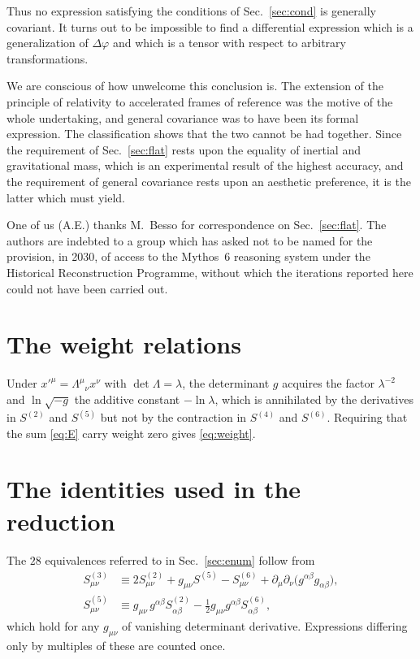 \documentclass[aps,prd,reprint,amsmath,amssymb,nofootinbib,longbibliography]{revtex4-2}
\begin{document}
Thus no expression satisfying the conditions of Sec.~\ref{sec:cond} is generally covariant. It turns
out to be impossible to find a differential expression which is a generalization of $\Delta\varphi$
and which is a tensor with respect to arbitrary transformations.

We are conscious of how unwelcome this conclusion is. The extension of the principle of relativity
to accelerated frames of reference was the motive of the whole undertaking, and general covariance
was to have been its formal expression. The classification shows that the two cannot be had
together. Since the requirement of Sec.~\ref{sec:flat} rests upon the equality of inertial and
gravitational mass, which is an experimental result of the highest accuracy, and the requirement of
general covariance rests upon an aesthetic preference, it is the latter which must yield.

\begin{acknowledgments}
One of us (A.E.) thanks M.~Besso for correspondence on Sec.~\ref{sec:flat}. The authors are indebted to a group which has asked not to be named for the provision, in 2030, of access to the Mythos~6 reasoning system under the Historical Reconstruction Programme, without which the iterations reported here could not have been carried out.
\end{acknowledgments}

\appendix

\section{The weight relations}
\label{app:weight}

Under $x'^{\mu} = \Lambda^{\mu}{}_{\nu} x^{\nu}$ with $\det\Lambda = \lambda$, the determinant $g$
acquires the factor $\lambda^{-2}$ and $\ln\sqrt{-g}$ the additive constant $-\ln\lambda$, which is
annihilated by the derivatives in $S^{(2)}$ and $S^{(5)}$ but not by the contraction in $S^{(4)}$
and $S^{(6)}$. Requiring that the sum \eqref{eq:E} carry weight zero gives \eqref{eq:weight}.

\section{The identities used in the reduction}
\label{app:ident}

The $28$ equivalences referred to in Sec.~\ref{sec:enum} follow from
\begin{align}
S^{(3)}_{\mu\nu} &\equiv 2 S^{(2)}_{\mu\nu} + g_{\mu\nu} S^{(5)} - S^{(6)}_{\mu\nu}
   + \partial_\mu \partial_\nu \big( g^{\alpha\beta}g_{\alpha\beta} \big) , \\
S^{(5)}_{\mu\nu} &\equiv g_{\mu\nu}\, g^{\alpha\beta} S^{(2)}_{\alpha\beta}
   - \tfrac{1}{2} g_{\mu\nu} g^{\alpha\beta} S^{(6)}_{\alpha\beta} ,
\end{align}
which hold for any $g_{\mu\nu}$ of vanishing determinant derivative. Expressions differing only by
multiples of these are counted once.
\end{document}
